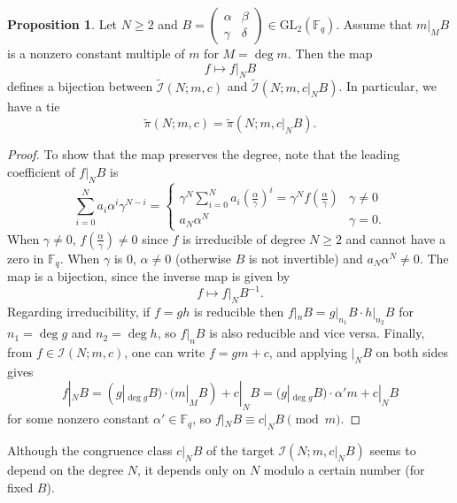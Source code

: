 \documentclass[10pt,reqno]{amsproc}
\newcommand{\GL}{\mathrm{GL}}
\newcommand{\bF}{\mathbb{F}}
\newcommand{\cI}{\mathcal{I}}
\newcommand{\1}{\mathds{1}}	%
\theoremstyle{definition}
\newtheorem{proposition}[theorem]{Proposition}
\theoremstyle{remark}
\begin{document}
\begin{proposition}
    \label{prop:gl2bijection_nonmono}
    Let $N \ge 2$ and $B = \left(\begin{smallmatrix}
        \alpha & \beta \\ \gamma & \delta
    \end{smallmatrix}\right) \in \GL_2(\bF_q)$.
    Assume that $m|_{M}B$ is a nonzero constant multiple of $m$ for $M = \deg m$.
    Then the map
    \begin{equation}
    \label{eqn:bij}
        f \mapsto f|_N B
    \end{equation}
    defines a bijection between $\widetilde{\cI}(N; m, c)$ and $\widetilde{\cI}(N; m, c|_{N} B)$.
    In particular, we have a tie
    \[
    \widetilde{\pi}(N; m, c) = \widetilde{\pi}(N; m, c|_N B).
    \]
\end{proposition}
\begin{proof}
    To show that the map preserves the degree, note that the leading coefficient of $f|_N B$ is
    \begin{equation}
        \label{eqn:lc}
        \sum_{i=0}^{N} a_i \alpha^i \gamma^{N-i} = \begin{cases}
            \gamma^N \sum_{i=0}^{N} a_i \left(\frac{\alpha}{\gamma}\right)^i = \gamma^N f\left(\frac{\alpha}{\gamma}\right) & \gamma \ne 0 \\
            a_N \alpha^N & \gamma = 0.
        \end{cases}
    \end{equation}
    When $\gamma \ne 0$, $f\left(\frac{\alpha}{\gamma}\right) \ne 0$ since $f$ is irreducible of degree $N \ge 2$ and cannot have a zero in $\bF_q$.
    When $\gamma$ is 0, $\alpha \ne 0$ (otherwise $B$ is not invertible) and $a_N \alpha^N \ne 0$.
    The map is a bijection, since the inverse map is given by
    \[
        f \mapsto f|_N B^{-1}.
    \]
    Regarding irreducibility, if $f = gh$ is reducible then $f|_n B = g|_{n_1} B \cdot h|_{n_2} B$ for $n_1 = \deg g$ and $n_2 = \deg h$, so $f|_n B$ is also reducible and vice versa.
    Finally, from $f \in \cI(N; m, c)$, one can write $f = gm + c$, and applying $|_N B$ on both sides gives
    \[
        f|_N B = (g|_{\deg g} B) \cdot (m|_{M} B) + c|_N B = (g|_{\deg g} B) \cdot \alpha' m + c|_N B
    \]
    for some nonzero constant $\alpha' \in \bF_q$, so $f|_N B \equiv c|_N B \pmod{m}$.
\end{proof}





Although the congruence class $c|_N B$ of the target $\cI(N; m, c|_{N} B)$ seems to depend on the degree $N$, it depends only on $N$ modulo a certain number (for fixed $B$).
\end{document}
